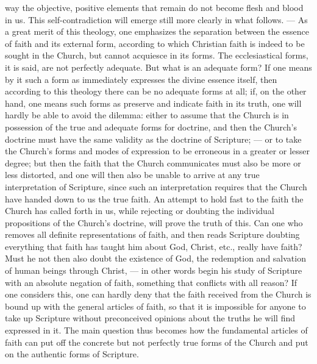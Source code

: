 \documentclass[12pt]{book}
\newcommand{\opage}[1]{\marginnote{\footnotesize\textit{[#1]}}}
\begin{document}
way the objective, positive elements that remain do not become flesh and blood
in us. This self-contradiction will emerge still more clearly in what follows.
--- As a great merit of this theology, one emphasizes the separation between
the essence of faith and its external form, according to which Christian faith
is indeed to be sought in the Church, but cannot acquiesce in its forms. The
ecclesiastical forms, it is said, are not perfectly adequate. But what is an
adequate form? If one means by it such a form as immediately expresses the
divine essence itself, then according to this theology there can be no
adequate forms at all; if, on the other hand, one means such forms as preserve
and indicate faith in its truth, one will hardly be able to avoid the dilemma:
either to assume that the Church is in possession of the true and adequate
forms for doctrine, and then the Church's doctrine must have the same
\opage{107} validity as the doctrine of Scripture; --- or to take the Church's
forms and modes of expression to be erroneous in a greater or lesser degree;
but then the faith that the Church communicates must also be more or less
distorted, and one will then also be unable to arrive at any true
interpretation of Scripture, since such an interpretation requires that the
Church have handed down to us the true faith. An attempt to hold fast to the
faith the Church has called forth in us, while rejecting or doubting the
individual propositions of the Church's doctrine, will prove the truth of this.
Can one who removes all definite representations of faith, and then reads
Scripture doubting everything that faith has taught him about God, Christ,
etc., really have faith? Must he not then also doubt the existence of God, the
redemption and salvation of human beings through Christ, --- in other words
begin his study of Scripture with an absolute negation of faith, something that
conflicts with all reason? If one considers this, one can hardly deny that the
faith received from the Church is bound up with the general articles of faith,
so that it is impossible for anyone to take up Scripture without preconceived
opinions about the truths he will find expressed in it. The main question thus
becomes how the fundamental articles of faith can put off the concrete but not
perfectly true forms of the Church and put on the authentic forms of Scripture.
\end{document}
